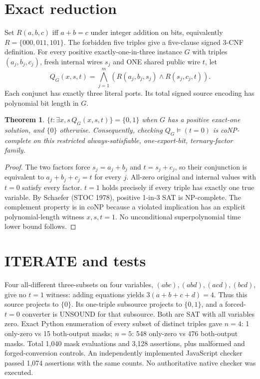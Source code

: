 \documentclass[11pt]{article}
\newtheorem{theorem}{Theorem}
\begin{document}
\section*{Exact reduction}
\noindent Set $R(a,b,c)$ iff $a+b=c$ under integer addition on bits, equivalently $R=\{000,011,101\}$. The forbidden five triples give a five-clause signed 3-CNF definition. For every positive exactly-one-in-three instance $G$ with triples $(a_j,b_j,c_j)$, fresh internal wires $s_j$ and ONE shared public wire $t$, let
\[
Q_G(x,s,t)=\bigwedge_{j=1}^m (R(a_j,b_j,s_j)\wedge R(s_j,c_j,t)).
\]
Each conjunct has exactly three literal ports. Its total signed source encoding has polynomial bit length in $G$.
\begin{theorem}
$\{t:\exists x,s\, Q_G(x,s,t)\}=\{0,1\}$ when $G$ has a positive exact-one solution, and $\{0\}$ otherwise. Consequently, checking $Q_G\models(t=0)$ is coNP-complete on this restricted always-satisfiable, one-export-bit, ternary-factor family.
\end{theorem}
\begin{proof}
The two factors force $s_j=a_j+b_j$ and $t=s_j+c_j$, so their conjunction is equivalent to $a_j+b_j+c_j=t$ for every $j$. All-zero original and internal values with $t=0$ satisfy every factor. $t=1$ holds precisely if every triple has exactly one true variable. By Schaefer (STOC 1978), positive 1-in-3 SAT is NP-complete. The complement property is in coNP because a violated implication has an explicit polynomial-length witness $x,s,t=1$. No unconditional superpolynomial time lower bound follows.
\end{proof}
\section*{ITERATE and tests}
\noindent Four all-different three-subsets on four variables, $(abc),(abd),(acd),(bcd)$, give no $t=1$ witness: adding equations yields $3(a+b+c+d)=4$. Thus this source projects to $\{0\}$. Its one-triple subsource projects to $\{0,1\}$, and a forced-$t=0$ converter is UNSOUND for that subsource. Both are SAT with all variables zero. Exact Python enumeration of every subset of distinct triples gave $n=4$: 1 only-zero vs 15 both-output masks; $n=5$: 548 only-zero vs 476 both-output masks. Total 1,040 mask evaluations and 3,128 assertions, plus malformed and forged-conversion controls. An independently implemented JavaScript checker passed 1,074 assertions with the same counts. No authoritative native checker was executed.
\end{document}
